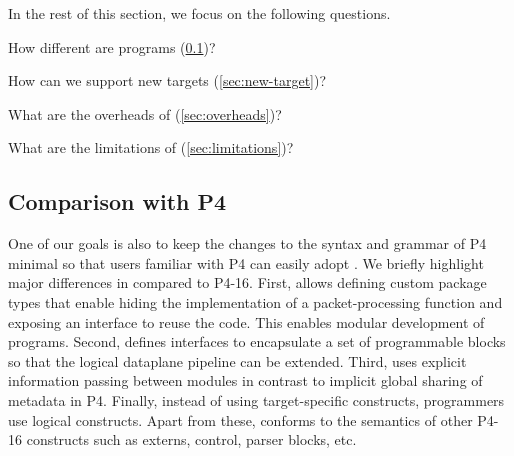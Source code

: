 \documentclass[letterpaper,twocolumn,10pt]{article}
\begin{document}
In the rest of this section, we focus on the following questions.
\begin{enumerate*}[label=(\roman*)]
  \item How different are \ulang programs (\cref{sec:comparison})?
  \item How can we support new targets (\cref{sec:new-target})?
  \item What are the overheads of \ulang (\cref{sec:overheads})?
  \item What are the limitations of \ulang (\cref{sec:limitations})?
\end{enumerate*}


\subsection{Comparison with P4}
\label{sec:comparison}
One of our goals is also to keep the changes to the syntax and grammar
of P4 minimal so that users familiar with P4 can easily adopt \ulang.
We briefly highlight major differences in \ulang compared to P4-16.
First, \ulang allows defining custom package types that enable hiding
the implementation of a packet-processing function and exposing an
interface to reuse the code. This enables modular development of
\ulang programs. Second, \uarch defines interfaces to encapsulate a
set of programmable blocks so that the logical dataplane pipeline can
be extended. Third, \uarch uses explicit information passing between
modules in contrast to implicit global sharing of metadata in P4.
Finally, instead of using target-specific constructs, programmers use
logical \uarch constructs. Apart from these, \ulang conforms to the
semantics of other P4-16 constructs such as externs, control, parser
blocks, etc.

\end{document}
